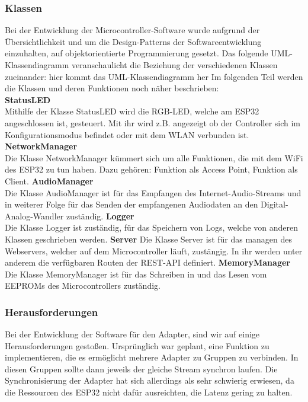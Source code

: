 \documentclass[]{article}
\begin{document}
\subsubsection{Klassen}
Bei der Entwicklung der Microcontroller-Software wurde aufgrund der Übersichtlichkeit und um die Design-Patterns der Softwareentwicklung einzuhalten, auf objektorientierte Programmierung gesetzt. Das folgende UML-Klassendiagramm veranschaulicht die Beziehung der verschiedenen Klassen zueinander:
hier kommt das UML-Klassendiagramm her
Im folgenden Teil werden die Klassen und deren Funktionen noch näher beschrieben:
\newline \\
\textbf{StatusLED} \\
Mithilfe der Klasse StatusLED wird die RGB-LED, welche am ESP32 angeschlossen ist, gesteuert. Mit ihr wird z.B. angezeigt ob der Controller sich im Konfigurationsmodus befindet oder mit dem WLAN verbunden ist.
\vspace{4mm}\newline
\textbf{NetworkManager} \\
Die Klasse NetworkManager kümmert sich um alle Funktionen, die mit dem WiFi des ESP32 zu tun haben. Dazu gehören: Funktion als Access Point, Funktion als Client.
\vspace{4mm}\newline
\textbf{AudioManager} \\
Die Klasse AudioManager ist für das Empfangen des Internet-Audio-Streams und in weiterer Folge für das Senden der empfangenen Audiodaten an den Digital-Analog-Wandler zuständig.
\vspace{4mm}\newline
\textbf{Logger} \\
Die Klasse Logger ist zuständig, für das Speichern von Logs, welche von anderen Klassen geschrieben werden. 
\vspace{4mm}\newline
\textbf{Server}
Die Klasse Server ist für das managen des Webservers, welcher auf dem Microcontroller läuft, zustängig. In ihr werden unter anderem die verfügbaren Routen der REST-API definiert.
\vspace{4mm}\newline
\textbf{MemoryManager}
Die Klasse MemoryManager ist für das Schreiben in und das Lesen vom EEPROMs des Microcontrollers zuständig.
\subsubsection{Herausforderungen}
Bei der Entwicklung der Software für den Adapter, sind wir auf einige Herausforderungen gestoßen. Ursprünglich war geplant, eine Funktion zu implementieren, die es ermöglicht mehrere Adapter zu Gruppen zu verbinden. In diesen Gruppen sollte dann jeweils der gleiche Stream synchron laufen. Die Synchronisierung der Adapter hat sich allerdings als sehr schwierig erwiesen, da die Ressourcen des ESP32 nicht dafür ausreichten, die Latenz gering zu halten.
\end{document}
